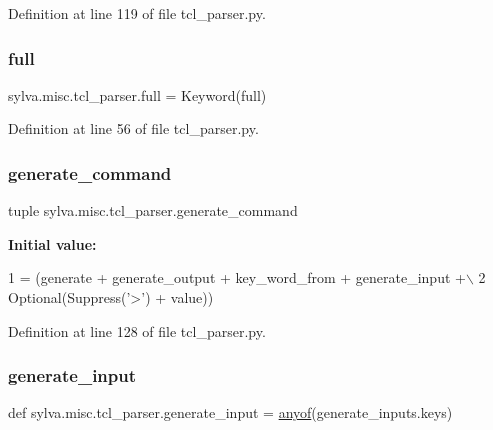 Definition at line 119 of file tcl\+\_\+parser.\+py.

\mbox{\label{namespacesylva_1_1misc_1_1tcl__parser_acc30be6956c891e9bf8b6f3125e40e14}} 
\subsubsection{\texorpdfstring{full}{full}}
{\footnotesize\ttfamily sylva.\+misc.\+tcl\+\_\+parser.\+full = Keyword(\textquotesingle{}full\textquotesingle{})}



Definition at line 56 of file tcl\+\_\+parser.\+py.

\mbox{\label{namespacesylva_1_1misc_1_1tcl__parser_a09154238372afd143ddb6fdd344dbf1e}} 
\subsubsection{\texorpdfstring{generate\+\_\+command}{generate\_command}}
{\footnotesize\ttfamily tuple sylva.\+misc.\+tcl\+\_\+parser.\+generate\+\_\+command}

{\bfseries Initial value\+:}
\begin{DoxyCode}
1 =  (generate + generate\_output + key\_word\_from + generate\_input +\(\backslash\)
2     Optional(Suppress(\textcolor{stringliteral}{'>'}) + value))
\end{DoxyCode}


Definition at line 128 of file tcl\+\_\+parser.\+py.

\mbox{\label{namespacesylva_1_1misc_1_1tcl__parser_ae4978fc0cd51c6f590351e10d46bda95}} 
\subsubsection{\texorpdfstring{generate\+\_\+input}{generate\_input}}
{\footnotesize\ttfamily def sylva.\+misc.\+tcl\+\_\+parser.\+generate\+\_\+input = \hyperlink{namespacesylva_1_1misc_1_1tcl__parser_abc9d84dd4132e13b642242dfac628084}{anyof}(generate\+\_\+inputs.\+keys)}



